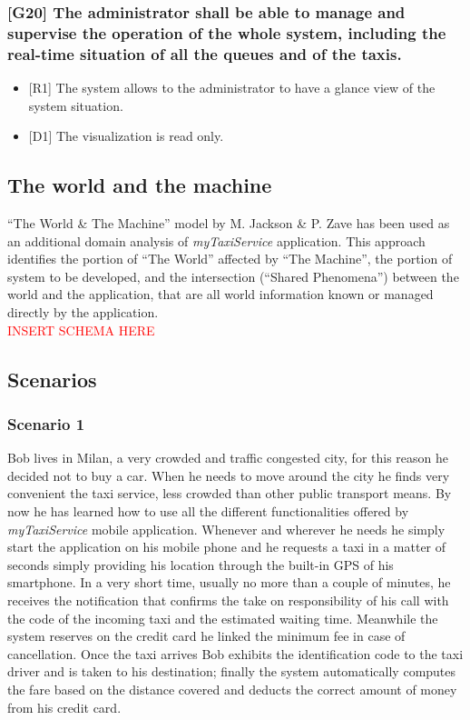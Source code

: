 \documentclass[a4paper,11pt]{report} %
\newcommand{\mts}{\mbox{\normalfont\itshape myTaxiService}}
\begin{document}
	\subsubsection{{[}G20{]} The administrator shall be able to manage and supervise the operation of the whole system, including the real-time situation of all the queues and of the taxis.}
	\begin{itemize}
		\item {[}R1{]} The system allows to the administrator to have a glance view of the system situation.
		\item {[}D1{]} The visualization is read only.
	\end{itemize}							
		
	\subsection{The world and the machine} ``The World \& The Machine''	model by M. Jackson \& P. Zave has been used as an additional domain analysis of \mts{} application. This approach identifies the portion of ``The World'' affected by ``The Machine'', the portion of system to be developed, and the intersection (``Shared Phenomena'') between the world and the application, that are all world information known or
	managed directly by the application.\\\textcolor{red}{INSERT SCHEMA HERE}
	
	\subsection{Scenarios}
	
	\subsubsection{Scenario 1} Bob lives in Milan, a very crowded and traffic congested city, for this reason he decided not to buy a car. When he needs to move around the city he finds very convenient the taxi service, less crowded than other public transport means. By now he has learned how to use all the different functionalities offered by \mts{} mobile application. Whenever and wherever he needs he simply start the application on his mobile phone and he requests a taxi in a matter of seconds simply providing his location through the built-in GPS of his smartphone. In a very short time, usually no more than a couple of minutes, he receives the notification that confirms the take on responsibility of his call with the code of the incoming taxi and the estimated waiting time. Meanwhile the system reserves on the credit card he linked the minimum fee in case of cancellation. Once the taxi arrives Bob exhibits the identification code to the taxi driver and is taken to his destination; finally the system automatically computes the fare based on the distance covered and deducts the correct amount of money from his credit card. 
	
\end{document}
